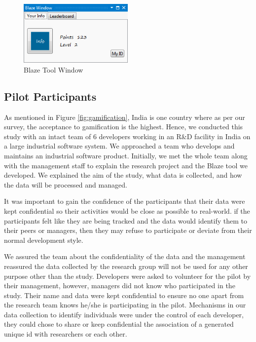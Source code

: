 \documentclass{sig-alternate}
\begin{document}
\begin{figure}
	\centering
	\includegraphics[width=2.2in]{blazeWindow.png}
	\caption{Blaze Tool Window}
	\label{fig:blazeWindow}
\end{figure}

\subsection{Pilot Participants}

As mentioned in Figure \ref{fig:gamification}, India is one country where as per our survey, the acceptance to gamification is the highest. Hence, we conducted this study with an intact team of 6 developers working in an R\&D facility in India on a large industrial software system. We approached a team who develops and maintains an industrial software product. Initially, we met the whole team along with the management staff to explain the research project and the Blaze tool we developed. We  explained the aim of the study, what data is collected, and how the data will be processed and managed. 

It was important to gain the confidence of the participants that their data were kept confidential so their activities would be close as possible to real-world. if the participants felt like they are being tracked and the data would identify them to their peers or managers, then they may refuse to participate or deviate from their normal development style.

We  assured the team about the confidentiality of the data and the management reassured the data collected by the research group will not be used for any other purpose other than the study.  Developers were asked to volunteer for the pilot by their management, however, managers did not know who participated in the study. Their name and data were kept confidential to ensure no one apart from the research team knows he/she is participating in the pilot. Mechanisms in our data collection to identify individuals were under the control of each developer, they could chose to share or keep confidential the association of a generated unique id with researchers or each other.   
\end{document}
